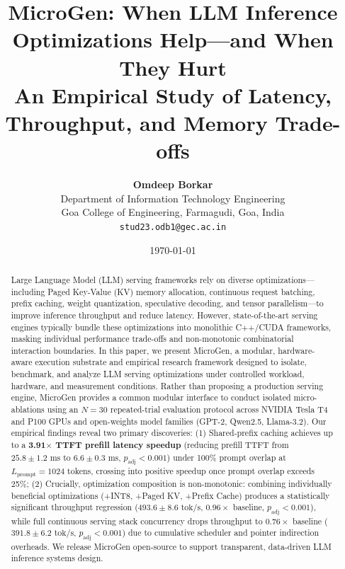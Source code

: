 \documentclass[10pt,twocolumn,letterpaper]{article}
\title{\textbf{MicroGen: When LLM Inference Optimizations Help---and When They Hurt}\\ \Large An Empirical Study of Latency, Throughput, and Memory Trade-offs}
\author{
  \textbf{Omdeep Borkar}\\
  \small Department of Information Technology Engineering\\
  \small Goa College of Engineering, Farmagudi, Goa, India\\
  \small \texttt{stud23.odb1@gec.ac.in}
}
\date{\today}
\begin{document}
\maketitle

\begin{abstract}
Large Language Model (LLM) serving frameworks rely on diverse optimizations---including Paged Key-Value (KV) memory allocation, continuous request batching, prefix caching, weight quantization, speculative decoding, and tensor parallelism---to improve inference throughput and reduce latency. However, state-of-the-art serving engines typically bundle these optimizations into monolithic C++/CUDA frameworks, masking individual performance trade-offs and non-monotonic combinatorial interaction boundaries. In this paper, we present \textsf{MicroGen}, a modular, hardware-aware execution substrate and empirical research framework designed to isolate, benchmark, and analyze LLM serving optimizations under controlled workload, hardware, and measurement conditions. Rather than proposing a production serving engine, \textsf{MicroGen} provides a common modular interface to conduct isolated micro-ablations using an $N=30$ repeated-trial evaluation protocol across NVIDIA Tesla T4 and P100 GPUs and open-weights model families (GPT-2, Qwen2.5, Llama-3.2). Our empirical findings reveal two primary discoveries: (1) Shared-prefix caching achieves up to a \textbf{3.91$\times$ TTFT prefill latency speedup} (reducing prefill TTFT from $25.8 \pm 1.2\text{ ms}$ to $6.6 \pm 0.3\text{ ms}$, $p_{\text{adj}} < 0.001$) under 100\% prompt overlap at $L_{\text{prompt}}=1024$ tokens, crossing into positive speedup once prompt overlap exceeds 25\%; (2) Crucially, optimization composition is non-monotonic: combining individually beneficial optimizations (+INT8, +Paged KV, +Prefix Cache) produces a statistically significant throughput regression ($493.6 \pm 8.6\text{ tok/s}$, $0.96\times$ baseline, $p_{\text{adj}} < 0.001$), while full continuous serving stack concurrency drops throughput to $0.76\times$ baseline ($391.8 \pm 6.2\text{ tok/s}$, $p_{\text{adj}} < 0.001$) due to cumulative scheduler and pointer indirection overheads. We release \textsf{MicroGen} open-source to support transparent, data-driven LLM inference systems design.
\end{abstract}












\end{document}

